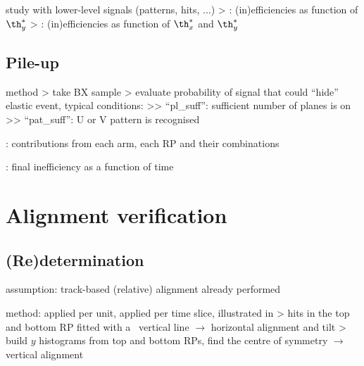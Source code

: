 \> study with lower-level signals (patterns, hits, ...)
\>> : (in)efficiencies as function of $\th_y^*$
\>> : (in)efficiencies as function of $\th_x^*$ and $\th_y^*$




\iffalse
\> \plot{efficiencies/eff3outof4.pdf} : single RP inefficiencies WITHOUT the cut in $\th_x^*$

\> \plot{efficiencies/eff3outof4_2D.pdf} : single RP inefficiencies as function of $\th_x^*$ and $\th_y^*$
\>> clearly indicates the inefficiency due to the horizontal RPs
\>> vertical dashed lines show the $\th_x^*$ cut to select only region with reasonable efficiency

\> \plot{efficiencies/eff3outof4_afterCut.pdf} : single RP inefficiencies WITH the cut in $\th_x^*$
\>> red: with the $\th_x^*$ cut, green: without
\>> with cut: plateau flat
\fi

\subsection{Pile-up}

\> method
\>> take BX sample
\>> evaluate probability of signal that could ``hide'' elastic event, typical conditions:
\>>> ``pl\_suff'': sufficient number of planes is on
\>>> ``pat\_suff'': U or V pattern is recognised 

\> : contributions from each arm, each RP and their combinations

\> : final inefficiency as a function of time

\section{Alignment verification}

\subsection{(Re)determination}

\> assumption: track-based (relative) alignment already performed

\> method: applied per unit, applied per time slice, illustrated in 
\>> hits in the top and bottom RP fitted with a ~vertical line $\rightarrow$ horizontal alignment and tilt
\>> build $y$ histograms from top and bottom RPs, find the centre of symmetry $\rightarrow$ vertical alignment

